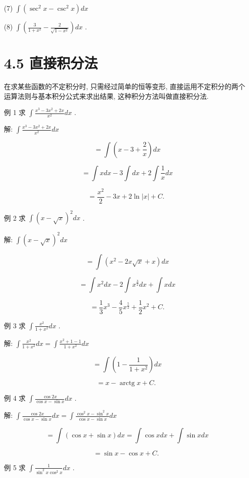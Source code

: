 \documentclass[10pt]{article}
\begin{document}
(7) \(\int \left( {{\sec }^{2}x - {\csc }^{2}x}\right) {dx}\)

(8) \(\int \left( {\frac{3}{1 + {x}^{2}} - \frac{2}{\sqrt{1 - {x}^{2}}}}\right) {dx}\) .

\section*{4.5 直接积分法}

在求某些函数的不定积分时, 只需经过简单的恒等变形, 直接运用不定积分的两个运算法则与基本积分公式来求出结果, 这种积分方法叫做直接积分法.

例 1 求 \(\int \frac{{x}^{3} - 3{x}^{2} + {2x}}{{x}^{2}}{dx}\) .

解: \(\int \frac{{x}^{3} - 3{x}^{2} + {2x}}{{x}^{2}}{dx}\)

\[
= \int \left( {x - 3 + \frac{2}{x}}\right) {dx}
\]

\[
= \int {xdx} - 3\int {dx} + 2\int \frac{1}{x}{dx}
\]

\[
= \frac{{x}^{2}}{2} - {3x} + 2\ln \left| x\right| + C\text{. }
\]

例 2 求 \(\int {\left( x - \sqrt{x}\right) }^{2}{dx}\) .

解: \(\int {\left( x - \sqrt{x}\right) }^{2}{dx}\)

\[
= \int \left( {{x}^{2} - {2x}\sqrt{x} + x}\right) {dx}
\]

\[
= \int {x}^{2}{dx} - 2\int {x}^{\frac{3}{2}}{dx} + \int {xdx}
\]

\[
= \frac{1}{3}{x}^{3} - \frac{4}{5}{x}^{\frac{5}{2}} + \frac{1}{2}{x}^{2} + C.
\]

例 3 求 \(\int \frac{{x}^{2}}{1 + {x}^{2}}{dx}\) .

解: \(\int \frac{{x}^{2}}{1 + {x}^{2}}{dx} = \int \frac{{x}^{2} + 1 - 1}{1 + {x}^{2}}{dx}\)

\[
= \int \left( {1 - \frac{1}{1 + {x}^{2}}}\right) {dx}
\]

\[
= x - \operatorname{arctg}x + C\text{. }
\]

例 4 求 \(\int \frac{\cos {2x}}{\cos x - \sin x}{dx}\) .

解: \(\int \frac{\cos {2x}}{\cos x - \sin x}{dx} = \int \frac{{\cos }^{2}x - {\sin }^{2}x}{\cos x - \sin x}{dx}\)

\[
= \int \left( {\cos x + \sin x}\right) {dx} = \int \cos {xdx} + \int \sin {xdx}
\]

\[
= \sin x - \cos x + C\text{. }
\]

例 5 求 \(\int \frac{1}{{\sin }^{2}x{\cos }^{2}x}{dx}\) .
\end{document}

